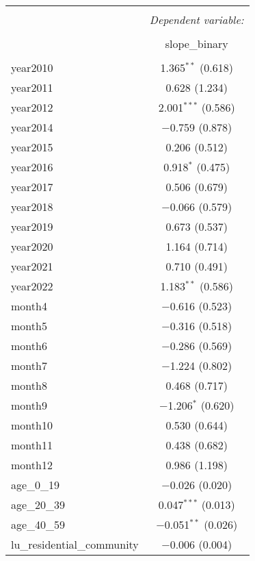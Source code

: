 \begin{table}[!htbp] \centering 
  \caption{} 
  \label{} 
\small 
\begin{tabular}{@{\extracolsep{1pt}}lc} 
\\[-1.8ex]\hline 
\hline \\[-1.8ex] 
 & \multicolumn{1}{c}{\textit{Dependent variable:}} \\ 
\cline{2-2} 
\\[-1.8ex] & slope\_binary \\ 
\hline \\[-1.8ex] 
 year2010 & 1.365$^{**}$ (0.618) \\ 
  year2011 & 0.628 (1.234) \\ 
  year2012 & 2.001$^{***}$ (0.586) \\ 
  year2014 & $-$0.759 (0.878) \\ 
  year2015 & 0.206 (0.512) \\ 
  year2016 & 0.918$^{*}$ (0.475) \\ 
  year2017 & 0.506 (0.679) \\ 
  year2018 & $-$0.066 (0.579) \\ 
  year2019 & 0.673 (0.537) \\ 
  year2020 & 1.164 (0.714) \\ 
  year2021 & 0.710 (0.491) \\ 
  year2022 & 1.183$^{**}$ (0.586) \\ 
  month4 & $-$0.616 (0.523) \\ 
  month5 & $-$0.316 (0.518) \\ 
  month6 & $-$0.286 (0.569) \\ 
  month7 & $-$1.224 (0.802) \\ 
  month8 & 0.468 (0.717) \\ 
  month9 & $-$1.206$^{*}$ (0.620) \\ 
  month10 & 0.530 (0.644) \\ 
  month11 & 0.438 (0.682) \\ 
  month12 & 0.986 (1.198) \\ 
  age\_0\_19 & $-$0.026 (0.020) \\ 
  age\_20\_39 & 0.047$^{***}$ (0.013) \\ 
  age\_40\_59 & $-$0.051$^{**}$ (0.026) \\ 
  lu\_residential\_community & $-$0.006 (0.004) \\ 

\end{tabular}
\end{table}
